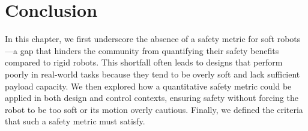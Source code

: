 \section{Conclusion}
In this chapter, we first underscore the absence of a safety metric for soft robots—a gap that hinders the community from quantifying their safety benefits compared to rigid robots. This shortfall often leads to designs that perform poorly in real-world tasks because they tend to be overly soft and lack sufficient payload capacity. We then explored how a quantitative safety metric could be applied in both design and control contexts, ensuring safety without forcing the robot to be too soft or its motion overly cautious. Finally, we defined the criteria that such a safety metric must satisfy.

